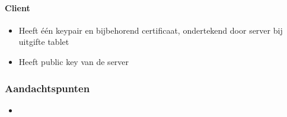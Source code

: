 \paragraph{Client}
\begin{itemize}
	\item Heeft één keypair en bijbehorend certificaat, ondertekend door server bij uitgifte tablet
  \item Heeft public key van de server
\end{itemize}

\subsubsection{Aandachtspunten}
\begin{itemize}
  \item 
\end{itemize}



